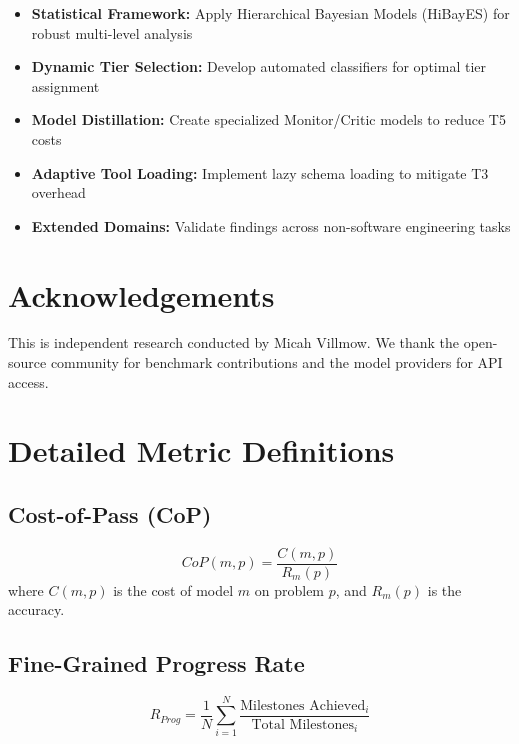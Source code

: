 \documentclass[11pt]{article}
\begin{document}
\begin{itemize}
    \item \textbf{Statistical Framework:} Apply Hierarchical Bayesian Models (HiBayES) for robust multi-level analysis
    \item \textbf{Dynamic Tier Selection:} Develop automated classifiers for optimal tier assignment
    \item \textbf{Model Distillation:} Create specialized Monitor/Critic models to reduce T5 costs
    \item \textbf{Adaptive Tool Loading:} Implement lazy schema loading to mitigate T3 overhead
    \item \textbf{Extended Domains:} Validate findings across non-software engineering tasks
\end{itemize}

\section*{Acknowledgements}
This is independent research conducted by Micah Villmow. We thank the open-source community for benchmark contributions and the model providers for API access.


% 

\appendix

\section{Detailed Metric Definitions}

\subsection{Cost-of-Pass (CoP)}
\begin{equation}
    CoP(m, p) = \frac{C(m, p)}{R_m(p)}
\end{equation}
where $C(m, p)$ is the cost of model $m$ on problem $p$, and $R_m(p)$ is the accuracy.

\subsection{Fine-Grained Progress Rate}
\begin{equation}
    R_{Prog} = \frac{1}{N} \sum_{i=1}^{N} \frac{\text{Milestones Achieved}_i}{\text{Total Milestones}_i}
\end{equation}
\end{document}
